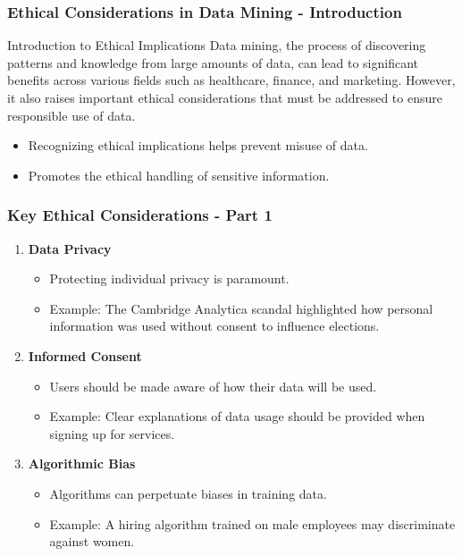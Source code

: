 \documentclass[aspectratio=169]{beamer}
\begin{document}
\begin{frame}[fragile]
    \frametitle{Ethical Considerations in Data Mining - Introduction}
    \begin{block}{Introduction to Ethical Implications}
        Data mining, the process of discovering patterns and knowledge from large amounts of data, can lead to significant benefits across various fields such as healthcare, finance, and marketing. However, it also raises important ethical considerations that must be addressed to ensure responsible use of data.
    \end{block}
    \begin{itemize}
        \item Recognizing ethical implications helps prevent misuse of data.
        \item Promotes the ethical handling of sensitive information.
    \end{itemize}
\end{frame}

\begin{frame}[fragile]
    \frametitle{Key Ethical Considerations - Part 1}
    \begin{enumerate}
        \item \textbf{Data Privacy}
            \begin{itemize}
                \item Protecting individual privacy is paramount.
                \item Example: The Cambridge Analytica scandal highlighted how personal information was used without consent to influence elections.
            \end{itemize}
        
        \item \textbf{Informed Consent}
            \begin{itemize}
                \item Users should be made aware of how their data will be used.
                \item Example: Clear explanations of data usage should be provided when signing up for services.
            \end{itemize}

        \item \textbf{Algorithmic Bias}
            \begin{itemize}
                \item Algorithms can perpetuate biases in training data.
                \item Example: A hiring algorithm trained on male employees may discriminate against women.
            \end{itemize}
    \end{enumerate}
\end{frame}
\end{document}
